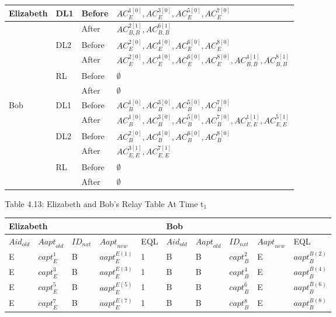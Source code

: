 \begin{tabular}{|p{0.5in}|p{0.3in}|p{0.4in}|p{1.8in}|} \hline 
Elizabeth & DL1 & Before & ${AC}^{1\left[0\right]}_E,{AC}^{3\left[0\right]}_E,{AC}^{5\left[0\right]}_E,{AC}^{7\left[0\right]}_E$ \\ \hline 
 &  & After & ${AC}^{2\left[1\right]}_{B,B},{AC}^{6\left[1\right]}_{B,B}$ \\ \hline 
 & DL2 & Before & ${AC}^{2\left[0\right]}_E,{AC}^{4\left[0\right]}_E,{AC}^{6\left[0\right]}_E,{AC}^{8\left[0\right]}_E$ \\ \hline 
 &  & After & ${AC}^{2\left[0\right]}_E,{AC}^{4\left[0\right]}_E,{AC}^{6\left[0\right]}_E,{AC}^{8\left[0\right]}_E,{AC}^{4\left[1\right]}_{B,B},{AC}^{8\left[1\right]}_{B,B}$ \\ \hline 
 & RL & Before & $\mathrm{\emptyset }$ \\ \hline 
 &  & After & $\mathrm{\emptyset }$ \\ \hline 
Bob & DL1 & Before & ${AC}^{1\left[0\right]}_B,{AC}^{3\left[0\right]}_B,{AC}^{5\left[0\right]}_B,{AC}^{7\left[0\right]}_B$ \\ \hline 
 &  & After & ${AC}^{1\left[0\right]}_B,{AC}^{3\left[0\right]}_B,{AC}^{5\left[0\right]}_B,{AC}^{7\left[0\right]}_B,{AC}^{1\left[1\right]}_{E,E},{AC}^{5\left[1\right]}_{E,E}$ \\ \hline 
 & DL2 & Before & ${AC}^{2\left[0\right]}_B,{AC}^{4\left[0\right]}_B,{AC}^{6\left[0\right]}_B,{AC}^{8\left[0\right]}_B$ \\ \hline 
 &  & After & ${AC}^{3\left[1\right]}_{E,E},{AC}^{7\left[1\right]}_{E,E}$ \\ \hline 
 & RL & Before & $\mathrm{\emptyset }$ \\ \hline 
 &  & After & $\mathrm{\emptyset }$ \\ \hline 
\end{tabular}

Table 4.13: Elizabeth and Bob's Relay Table At Time t${}_{1}$

\begin{tabular}{|p{0.4in}|p{0.4in}|p{0.3in}|p{0.5in}|p{0.3in}|p{0.4in}|p{0.4in}|p{0.4in}|p{0.4in}|p{0.5in}|} \hline 
\multicolumn{5}{|p{1in}|}{Elizabeth} & \multicolumn{5}{|p{2.0in}|}{Bob} \\ \hline 
${Aid}_{old}$ & ${Aapt}_{old}$ & ${ID}_{nxt}$ & ${Aapt}_{new}$ & EQL & ${Aid}_{old}$ & ${Aapt}_{old}$ & ${ID}_{nxt}$ & ${Aapt}_{new}$ & EQL \\ \hline 
E & ${capt}^1_E$ & B & ${aapt}^{E\left(1\right)}_E$ & 1 & B & B & ${capt}^2_B$ & E & ${aapt}^{B\left(2\right)}_B$ \\ \hline 
E & ${capt}^3_E$ & B & ${aapt}^{E\left(3\right)}_E$ & 1 & B & B & ${capt}^4_B$ & E & ${aapt}^{B\left(4\right)}_B$ \\ \hline 
E & ${capt}^5_E$ & B & ${aapt}^{E\left(5\right)}_E$ & 1 & B & B & ${capt}^6_B$ & E & ${aapt}^{B\left(6\right)}_B$ \\ \hline 
E & ${capt}^7_E$ & B & ${aapt}^{E\left(7\right)}_E$ & 1 & B & B & ${capt}^8_B$ & E & ${aapt}^{B\left(8\right)}_B$ \\ \hline 
\end{tabular}

